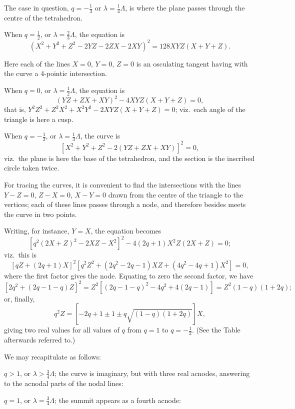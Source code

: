 \documentclass[12pt,a4paper]{article}
\theoremstyle{plain}
\theoremstyle{definition}
\begin{document}
The case in question, $q = -\tfrac{1}{3}$ or $\lambda = \tfrac{1}{4}\Lambda$, is where the plane passes through the centre of the tetrahedron.

When $q = \tfrac{1}{2}$, or $\lambda = \tfrac{2}{3}\Lambda$, the equation is
\[
(X^2 + Y^2 + Z^2 - 2YZ - 2ZX - 2XY)^2 = 128XYZ(X + Y + Z).
\]

Here each of the lines $X = 0$, $Y = 0$, $Z = 0$ is an osculating tangent having with the curve a 4-pointic intersection.

When $q = 0$, or $\lambda = \tfrac{1}{2}\Lambda$, the equation is
\[
(YZ + ZX + XY)^2 - 4XYZ(X + Y + Z) = 0,
\]
that is, $Y^2Z^2 + Z^2X^2 + X^2Y^2 - 2XYZ(X + Y + Z) = 0$; viz.\ each angle of the triangle is here a cusp.

When $q = -\tfrac{1}{2}$, or $\lambda = \tfrac{1}{3}\Lambda$, the curve is
\[
[X^2 + Y^2 + Z^2 - 2(YZ + ZX + XY)]^2 = 0,
\]
viz.\ the plane is here the base of the tetrahedron, and the section is the inscribed circle taken twice.

For tracing the curves, it is convenient to find the intersections with the lines $Y - Z = 0$, $Z - X = 0$, $X - Y = 0$ drawn from the centre of the triangle to the vertices; each of these lines passes through a node, and therefore besides meets the curve in two points.

Writing, for instance, $Y = X$, the equation becomes
\[
[q^2(2X + Z)^2 - 2XZ - X^2]^2 - 4(2q + 1)X^2Z(2X + Z) = 0;
\]
viz.\ this is
\[
[qZ + (2q + 1)X]^2[q^2Z^2 + (2q^2 - 2q - 1)XZ + (4q^2 - 4q + 1)X^2] = 0,
\]
where the first factor gives the node. Equating to zero the second factor, we have
\[
[2q^2 + (2q - 1 - q)Z]^2 = Z^2[(2q - 1 - q)^2 - 4q^2 + 4(2q - 1)] = Z^2(1 - q)(1 + 2q);
\]
or, finally,
\[
q^2Z = [-2q + 1 \pm 1 \pm q\sqrt{(1 - q)(1 + 2q)}]X,
\]
giving two real values for all values of $q$ from $q = 1$ to $q = -\tfrac{1}{2}$. (See the Table afterwards referred to.)

\newpage
\setcounter{page}{4}

We may recapitulate as follows:

\smallskip

$q > 1$, or $\lambda > \tfrac{3}{4}\Lambda$; the curve is imaginary, but with three real acnodes, answering to the acnodal parts of the nodal lines:

\smallskip

$q = 1$, or $\lambda = \tfrac{3}{4}\Lambda$; the summit appears as a fourth acnode:

\smallskip
\end{document}
